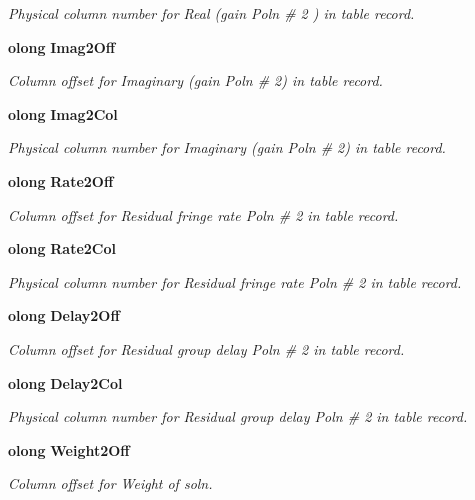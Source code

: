 \begin{CompactItemize}
\begin{CompactList}\small\item\em Physical column number for Real (gain Poln \# 2 ) in table record. \item\end{CompactList}\item 
{\bf olong} {\bf Imag2Off}
\begin{CompactList}\small\item\em Column offset for Imaginary (gain Poln \# 2) in table record. \item\end{CompactList}\item 
{\bf olong} {\bf Imag2Col}
\begin{CompactList}\small\item\em Physical column number for Imaginary (gain Poln \# 2) in table record. \item\end{CompactList}\item 
{\bf olong} {\bf Rate2Off}
\begin{CompactList}\small\item\em Column offset for Residual fringe rate Poln \# 2 in table record. \item\end{CompactList}\item 
{\bf olong} {\bf Rate2Col}
\begin{CompactList}\small\item\em Physical column number for Residual fringe rate Poln \# 2 in table record. \item\end{CompactList}\item 
{\bf olong} {\bf Delay2Off}
\begin{CompactList}\small\item\em Column offset for Residual group delay Poln \# 2 in table record. \item\end{CompactList}\item 
{\bf olong} {\bf Delay2Col}
\begin{CompactList}\small\item\em Physical column number for Residual group delay Poln \# 2 in table record. \item\end{CompactList}\item 
{\bf olong} {\bf Weight2Off}
\begin{CompactList}\small\item\em Column offset for Weight of soln. \item\end{CompactList}\item 

\end{CompactItemize}
